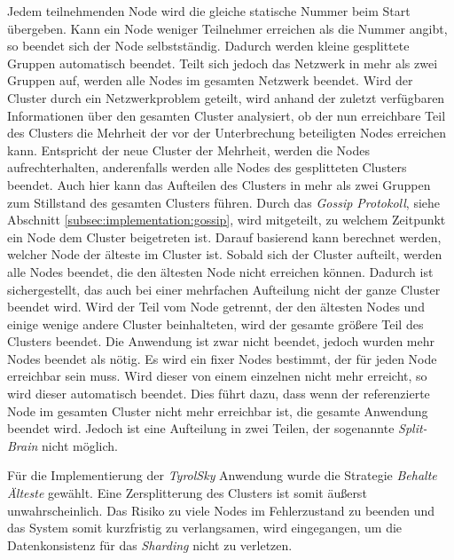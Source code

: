 \begin{itemize}
    Jedem teilnehmenden Node wird die gleiche statische Nummer beim Start übergeben. Kann ein Node weniger Teilnehmer erreichen als die Nummer angibt, so beendet sich der Node selbstständig. Dadurch werden kleine gesplittete Gruppen automatisch beendet. Teilt sich jedoch das Netzwerk in mehr als zwei Gruppen auf, werden alle Nodes im gesamten Netzwerk beendet. 
    Wird der Cluster durch ein Netzwerkproblem geteilt, wird anhand der zuletzt verfügbaren Informationen über den gesamten Cluster analysiert, ob der nun erreichbare Teil des Clusters die Mehrheit der vor der Unterbrechung  beteiligten Nodes  erreichen kann. Entspricht der neue Cluster der Mehrheit, werden die Nodes aufrechterhalten, anderenfalls werden alle Nodes des gesplitteten Clusters beendet. Auch hier kann das Aufteilen des Clusters in mehr als zwei Gruppen zum Stillstand des gesamten Clusters führen.
    Durch das \textit{Gossip Protokoll}, siehe Abschnitt \ref{subsec:implementation:gossip}, wird  mitgeteilt, zu welchem Zeitpunkt ein Node dem Cluster beigetreten ist. Darauf basierend kann berechnet werden, welcher Node der älteste im Cluster ist. Sobald sich der Cluster aufteilt, werden alle Nodes beendet, die den ältesten Node nicht erreichen können. Dadurch ist sichergestellt, das auch bei einer mehrfachen Aufteilung nicht der ganze Cluster beendet wird. Wird der Teil vom Node getrennt, der den ältesten Nodes und einige wenige andere Cluster beinhalteten, wird der gesamte größere Teil des Clusters beendet. Die Anwendung ist zwar nicht beendet, jedoch wurden mehr Nodes beendet als nötig. 
    Es wird ein fixer Nodes bestimmt, der für jeden Node erreichbar sein muss. Wird dieser von einem einzelnen nicht mehr erreicht, so wird dieser automatisch beendet. Dies führt dazu, dass wenn der referenzierte Node im gesamten Cluster nicht mehr erreichbar ist, die gesamte Anwendung beendet wird. Jedoch ist eine Aufteilung in zwei Teilen, der sogenannte \textit{Split-Brain} nicht möglich.
\end{itemize}
Für die Implementierung der \textit{TyrolSky} Anwendung wurde die Strategie \textit{Behalte Älteste} gewählt. Eine Zersplitterung des Clusters ist somit äußerst unwahrscheinlich. Das Risiko zu viele Nodes im Fehlerzustand zu beenden und das System somit kurzfristig zu verlangsamen, wird eingegangen, um die Datenkonsistenz für das \textit{Sharding} nicht zu verletzen.   


